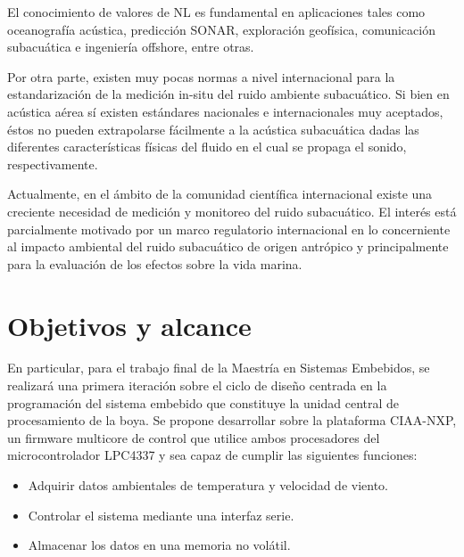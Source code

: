 
El conocimiento de valores de NL es fundamental en aplicaciones tales como oceanografía acústica, predicción SONAR, exploración geofísica, comunicación subacuática e ingeniería offshore, entre otras.

Por otra parte, existen muy pocas normas a nivel internacional para la estandarización de la medición in-situ del ruido ambiente subacuático. Si bien en acústica aérea sí existen estándares nacionales e internacionales muy aceptados, éstos no pueden extrapolarse fácilmente a la acústica subacuática dadas las diferentes características físicas del fluido en el cual se propaga el sonido, respectivamente.

Actualmente, en el ámbito de la comunidad científica internacional existe una creciente necesidad de medición y monitoreo del ruido subacuático. El interés está parcialmente motivado por un marco regulatorio internacional en lo concerniente al impacto ambiental del ruido subacuático de origen antrópico y principalmente para la evaluación de los efectos sobre la vida marina.



\section{Objetivos y alcance}
\label{sec:objetivosyalcances}


En particular, para el trabajo final de la Maestría en Sistemas Embebidos, se realizará una primera iteración sobre el ciclo de diseño centrada en la programación del sistema embebido que constituye la unidad central de procesamiento de la boya.  Se propone desarrollar sobre la plataforma CIAA-NXP, un firmware multicore de control que utilice ambos procesadores del microcontrolador LPC4337 y sea capaz de cumplir las siguientes funciones:

\begin{itemize}
	\item Adquirir datos ambientales de temperatura y velocidad de viento.
	\item Controlar el sistema mediante una interfaz serie.
	\item Almacenar los datos en una memoria no volátil.
\end{itemize}

